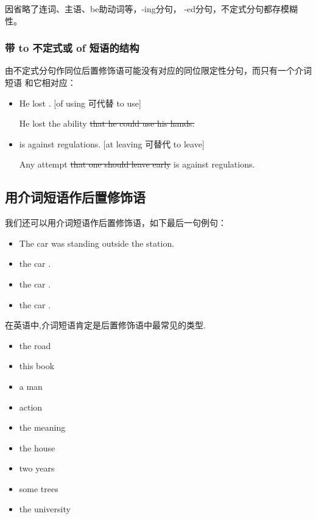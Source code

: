 因省略了连词、主语、be助动词等，-ing分句， -ed分句，不定式分句都存模糊性。

\subsubsection{带 to 不定式或 of 短语的结构}

由不定式分句作同位后置修饰语可能没有对应的同位限定性分句，而只有一个介词短语
和它相对应：
\begin{itemize}
\item He lost  . [of using 可代替 to use]

  He lost the ability \sout{that he could use his hands.}

\item {}  is against regulations. [at
  leaving 可替代 to leave]

  Any attempt \sout{that one should leave early} is against regulations.
\end{itemize}


\subsection{用介词短语作后置修饰语}

我们还可以用介词短语作后置修饰语，如下最后一句例句：
\begin{itemize}
\item The car was standing outside the station.
\item the car .
\item the car .
\item the car .
\end{itemize}

在英语中,介词短语肯定是后置修饰语中最常见的类型.

\begin{itemize}
\item the road 
\item this book 
\item a man 
\item action 
\item the meaning 
\item the house 
\item two years 
\item some trees 
\item the university 
\end{itemize}

